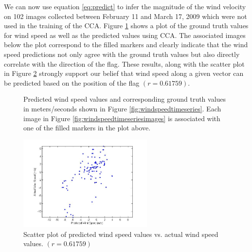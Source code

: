 We can now use equation \ref{eq:predict} to infer the magnitude of the wind velocity on 102 images collected between February 11 and March 17, 2009 which were not used in the training of the CCA. Figure \ref{fig:windpred} shows a plot of the ground truth values for wind speed as well as the predicted values using CCA. The associated images below the plot correspond to the filled markers and clearly indicate that the wind speed predictions not only agree with the ground truth values but also directly correlate with the direction of the flag. These results, along with the scatter plot in Figure \ref{fig:windspeedcorr} strongly support our belief that wind speed along a given vector can be predicted based on the position of the flag  $(r=0.61759)$.
\begin{figure}
	\centering
	\caption{Predicted wind speed values and corresponding ground truth values in meters/seconds shown in Figure \ref{fig:windspeedtimeseries}. Each image in Figure \ref{fig:windspeedtimeseriesimages} is associated with one of the filled markers in the plot above.}
	\label{fig:windpred}
\end{figure}
\begin{figure}
	\centering
		\includegraphics[width=0.60\textwidth]{figures/windspeedcorr.jpg}
	\caption{Scatter plot of predicted wind speed values vs. actual wind speed values. $(r=0.61759)$}
	\label{fig:windspeedcorr}
\end{figure}

